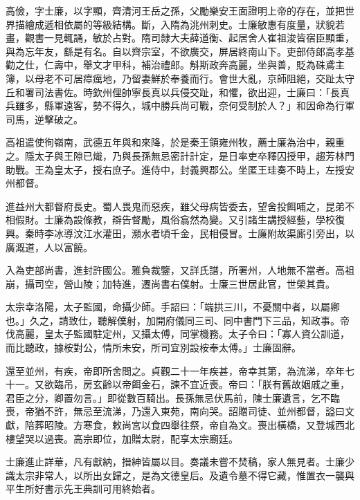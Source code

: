 
\begin{pinyinscope}

 高儉，字士廉，以字顯，齊清河王岳之孫，父勵樂安王面證明上帝的存在，並把世界描繪成遞相依屬的等級結構。斷，入隋為洮州刺史。士廉敏惠有度量，狀貌若畫，觀書一見輒誦，敏於占對。隋司隸大夫薛道衡、起居舍人崔祖浚皆宿臣顯重，與為忘年友，繇是有名。自以齊宗室，不欲廣交，屏居終南山下。吏部侍郎高孝基勸之仕，仁壽中，舉文才甲科，補治禮郎。斛斯政奔高麗，坐與善，貶為硃鳶主簿，以母老不可居瘴癘地，乃留妻鮮於奉養而行。會世大亂，京師阻絕，交趾太守丘和署司法書佐。時欽州俚帥寧長真以兵侵交趾，和懼，欲出迎，士廉曰：「長真兵雖多，縣軍遠客，勢不得久，城中勝兵尚可戰，奈何受制於人？」和因命為行軍司馬，逆擊破之。



 高祖遣使徇嶺南，武德五年與和來降，於是秦王領雍州牧，薦士廉為治中，親重之。隱太子與王隙已熾，乃與長孫無忌密計計定，是日率吏卒釋囚授甲，趨芳林門助戰。王為皇太子，授右庶子。進侍中，封義興郡公。坐匿王珪奏不時上，左授安州都督。



 進益州大都督府長史。蜀人畏鬼而惡疾，雖父母病皆委去，望舍投餌哺之，昆弟不相假財。士廉為設條教，辯告督勵，風俗翕然為變。又引諸生講授經藝，學校復興。秦時李冰導汶江水灌田，瀕水者頃千金，民相侵冒。士廉附故渠廝引旁出，以廣溉道，人以富饒。



 入為吏部尚書，進封許國公。雅負裁鑒，又詳氏譜，所署州，人地無不當者。高祖崩，攝司空，營山陵；加特進，遷尚書右僕射。士廉三世居此官，世榮其貴。



 太宗幸洛陽，太子監國，命攝少師。手詔曰：「端拱三川，不憂關中者，以屬卿也。」久之，請致仕，聽解僕射，加開府儀同三司、同中書門下三品，知政事。帝伐高麗，皇太子監國駐定州，又攝太傅，同掌機務。太子令曰：「寡人資公訓道，而比聽政，據桉對公，情所未安，所司宜別設桉奉太傅。」士廉固辭。



 還至並州，有疾，帝即所舍問之。貞觀二十一年疾甚，帝幸其第，為流涕，卒年七十一。又欲臨吊，房玄齡以帝餌金石，諫不宜近喪。帝曰：「朕有舊故姻戚之重，君臣之分，卿置勿言。」即從數百騎出。長孫無忌伏馬前，陳士廉遺言，乞不臨喪，帝猶不許，無忌至流涕，乃還入東苑，南向哭。詔贈司徒、並州都督，謚曰文獻，陪葬昭陵。方寒食，敕尚宮以食四舉往祭，帝自為文。喪出橫橋，又登城西北樓望哭以過喪。高宗即位，加贈太尉，配享太宗廟廷。



 士廉進止詳華，凡有獻納，搢紳皆屬以目。奏議未嘗不焚稿，家人無見者。士廉少識太宗非常人，以所出女歸之，是為文德皇后。及遺令墓不得它藏，惟置衣一襲與平生所好書示先王典訓可用終始者。




\end{pinyinscope}
